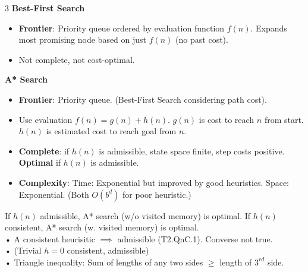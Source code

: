 \documentclass[a4paper, 9pt, landscape]{article}
\begin{document}
\begin{multicols*}{3}
\textbf{Best-First Search}
\begin{itemize}
    \item \textbf{Frontier}: Priority queue ordered by evaluation function $f(n)$. Expands most promising node based on just $f(n)$ (no past cost).
    \item Not complete, not cost-optimal.
\end{itemize}

\smallskip
\textbf{A* Search}
\begin{itemize}
    \item \textbf{Frontier}: Priority queue. (Best-First Search considering path cost).
    \item Use evaluation $f(n) = g(n) + h(n)$. $g(n)$ is cost to reach $n$ from start. $h(n)$ is estimated cost to reach goal from $n$.
    \item \textbf{Complete}: if $h(n)$ is admissible, state space finite, step costs positive. \textbf{Optimal} if $h(n)$ is admissible.
    \item \textbf{Complexity}: Time: Exponential but improved by good heuristics. Space: Exponential. (Both $O(b^d)$ for poor heuristic.)
\end{itemize}
If $h(n)$ admissible, A* search (w/o visited memory) is optimal. If $h(n)$ consistent, A* search (w. visited memory) is optimal.
\\ \smallskip
• A consistent heurisitic $\implies$ admissible (T2.QnC.1). Converse not true.\\
• (Trivial $h=0$ consistent, admissible) \\
• Triangle inequality: Sum of lengths of any two sides $\geq$ length of $3^{rd}$ side.



\end{multicols*}
\end{document}
